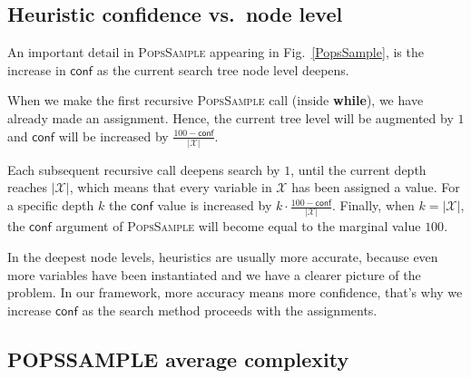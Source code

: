\documentclass{ws-ijait}
\begin{document}
\subsection{Heuristic confidence vs.\ node level}

An important detail in \textsc{PopsSample} appearing in Fig.~\ref{PopsSample}, is the increase in $\mathsf{conf}$ as the current search tree node level deepens.

When we make the first recursive \textsc{PopsSample} call (inside \textbf{while}), we have already made an assignment. Hence, the current tree level will be augmented by $1$ and $\mathsf{conf}$ will be increased by $\frac{100 - \mathsf{conf}}{|\mathscr{X}|}$.

Each subsequent recursive call deepens search by $1$, until the current depth reaches $|\mathscr{X}|$, which means that every variable in $\mathscr{X}$ has been assigned a value. For a specific depth $k$ the $\mathsf{conf}$ value is increased by $k \cdot \frac{100 - \mathsf{conf}}{|\mathscr{X}|}$. Finally, when $k = |\mathscr{X}|$, the $\mathsf{conf}$ argument of \textsc{PopsSample} will become equal to the marginal value $100$.

In the deepest node levels, heuristics are usually more accurate, because even more variables have been instantiated and we have a clearer picture of the problem. In our framework, more accuracy means more confidence, that's why we increase $\mathsf{conf}$ as the search method proceeds with the assignments.

%
%

\newcommand{\PoPS}{\textbf{\large P\normalsize O\large PS}}
\newcommand{\PopsSample}{\textbf{\large P\normalsize OPS\large S\normalsize AMPLE}}

\subsection{\PopsSample{} average complexity}
\end{document}
